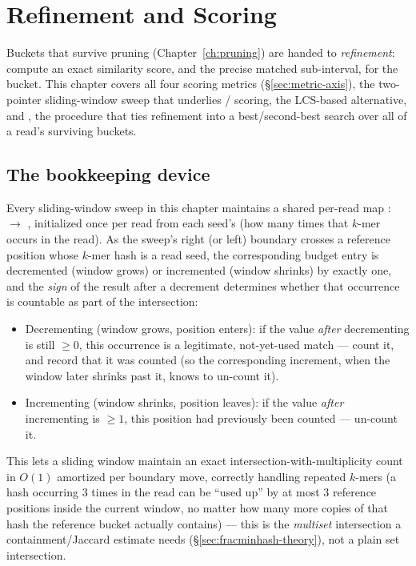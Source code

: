 \chapter{Refinement and Scoring}
\label{ch:scoring}

Buckets that survive pruning (Chapter~\ref{ch:pruning}) are handed to \emph{refinement}: compute
an exact similarity score, and the precise matched sub-interval, for the bucket. This chapter
covers all four scoring metrics (\S\ref{sec:metric-axis}), the two-pointer sliding-window sweep
that underlies / scoring, the LCS-based alternative, and
, the procedure that ties refinement into a best/second-best search over all of
a read's surviving buckets.

\section{The  bookkeeping device}
\label{sec:scoring-sliding-window}

Every sliding-window sweep in this chapter maintains a shared per-read map :
 $\to$ , initialized once per read from each seed's
 (how many times that $k$-mer occurs in the read). As the sweep's right (or
left) boundary crosses a reference position whose $k$-mer hash is a read seed, the corresponding
budget entry is decremented (window grows) or incremented (window shrinks) by exactly one, and
the \emph{sign} of the result after a decrement determines whether that occurrence is
countable as part of the intersection:
\begin{itemize}[nosep]
  \item Decrementing (window grows, position enters): if the value \emph{after} decrementing is
    still $\ge 0$, this occurrence is a legitimate, not-yet-used match --- count it, and record
    that it was counted (so the corresponding increment, when the window later shrinks past it,
    knows to un-count it).
  \item Incrementing (window shrinks, position leaves): if the value \emph{after} incrementing is
    $\ge 1$, this position had previously been counted --- un-count it.
\end{itemize}
This lets a sliding window maintain an exact intersection-with-multiplicity count in $O(1)$
amortized per boundary move, correctly handling repeated $k$-mers (a hash occurring 3 times in
the read can be ``used up'' by at most 3 reference positions inside the current window, no
matter how many more copies of that hash the reference bucket actually contains) --- this is the
\emph{multiset} intersection a containment/Jaccard estimate needs (\S\ref{sec:fracminhash-theory}),
not a plain set intersection.

